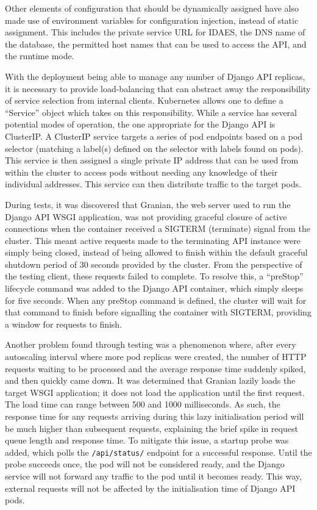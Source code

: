 Other elements of configuration that should be dynamically assigned have also made use of environment variables for configuration injection, instead of static assignment. This includes the private service URL for IDAES, the DNS name of the database, the permitted host names that can be used to access the API, and the runtime mode.

With the deployment being able to manage any number of Django API replicas, it is necessary to provide load-balancing that can abstract away the responsibility of service selection from internal clients. Kubernetes allows one to define a ``Service'' object which takes on this responsibility. While a service has several potential modes of operation, the one appropriate for the Django API is ClusterIP. A ClusterIP service targets a series of pod endpoints based on a pod selector (matching a label(s) defined on the selector with labels found on pods). This service is then assigned a single private IP address that can be used from within the cluster to access pods without needing any knowledge of their individual addresses. This service can then distribute traffic to the target pods.

During tests, it was discovered that Granian, the web server used to run the Django API WSGI application, was not providing graceful closure of active connections when the container received a SIGTERM (terminate) signal from the cluster. This meant active requests made to the terminating API instance were simply being closed, instead of being allowed to finish within the default graceful shutdown period of 30 seconds provided by the cluster. From the perspective of the testing client, these requests failed to complete. To resolve this, a ``preStop'' lifecycle command was added to the Django API container, which simply sleeps for five seconds. When any preStop command is defined, the cluster will wait for that command to finish before signalling the container with SIGTERM, providing a window for requests to finish.

Another problem found through testing was a phenomenon where, after every autoscaling interval where more pod replicas were created, the number of HTTP requests waiting to be processed and the average response time suddenly spiked, and then quickly came down. It was determined that Granian lazily loads the target WSGI application; it does not load the application until the first request. The load time can range between 500 and 1000 milliseconds. As such, the response time for any requests arriving during this lazy initialisation period will be much higher than subsequent requests, explaining the brief spike in request queue length and response time. To mitigate this issue, a startup probe was added, which polls the \verb|/api/status/| endpoint for a successful response. Until the probe succeeds once, the pod will not be considered ready, and the Django service will not forward any traffic to the pod until it becomes ready. This way, external requests will not be affected by the initialisation time of Django API pods.

